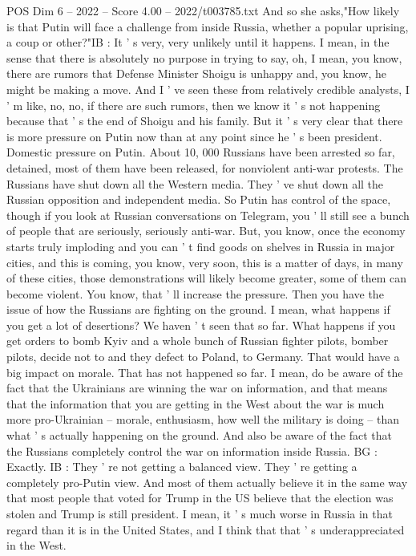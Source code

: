 \begin{textsample}{POS Dim 6 – 2022 – Score 4.00 – 2022/t003785.txt}
And so she asks,"How likely is that Putin will face a challenge from inside Russia, whether a popular uprising, a coup or other?"IB : It ' s very, very unlikely until it happens.
I mean, in the sense that there is absolutely no purpose in trying to say, oh, I mean, you know, there are rumors that Defense Minister Shoigu is unhappy and, you know, he might be making a move.
And I ' ve seen these from relatively credible analysts, I ' m like, no, no, if there are such rumors, then we know it ' s not happening because that ' s the end of Shoigu and his family.
But it ' s very clear that there is more pressure on Putin now than at any point since he ' s been president.
Domestic pressure on Putin.
About 10, 000 Russians have been arrested so far, detained, most of them have been released, for nonviolent anti-war protests.
The Russians have shut down all the Western media.
They ' ve shut down all the Russian opposition and independent media.
So Putin has control of the space, though if you look at Russian conversations on Telegram, you ' ll still see a bunch of people that are seriously, seriously anti-war.
But, you know, once the economy starts truly imploding and you can ' t find goods on shelves in Russia in major cities, and this is coming, you know, very soon, this is a matter of days, in many of these cities, those demonstrations will likely become greater, some of them can become violent.
You know, that ' ll increase the pressure.
Then you have the issue of how the Russians are fighting on the ground.
I mean, what happens if you get a lot of desertions?
We haven ' t seen that so far.
What happens if you get orders to bomb Kyiv and a whole bunch of Russian fighter pilots, bomber pilots, decide not to and they defect to Poland, to Germany.
That would have a big impact on morale.
That has not happened so far.
I mean, do be aware of the fact that the Ukrainians are winning the war on information, and that means that the information that you are getting in the West about the war is much more pro-Ukrainian -- morale, enthusiasm, how well the military is doing -- than what ' s actually happening on the ground.
And also be aware of the fact that the Russians completely control the war on information inside Russia.
BG : Exactly.
IB : They ' re not getting a balanced view.
They ' re getting a completely pro-Putin view.
And most of them actually believe it in the same way that most people that voted for Trump in the US believe that the election was stolen and Trump is still president.
I mean, it ' s much worse in Russia in that regard than it is in the United States, and I think that that ' s underappreciated in the West.

\end{textsample}

